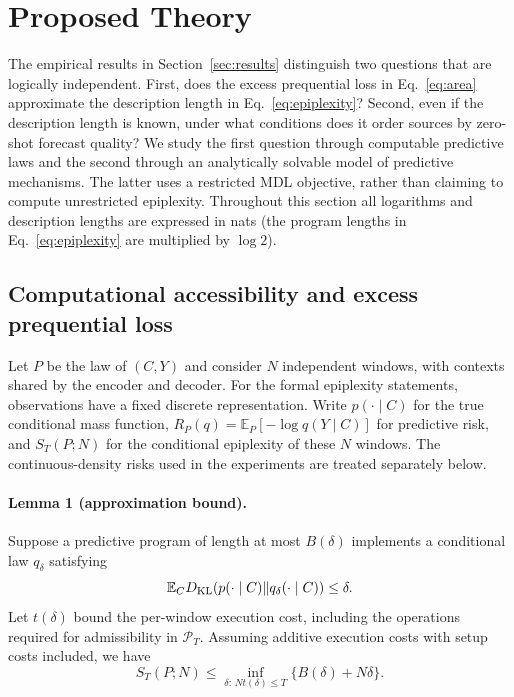 \documentclass[10pt,a4paper]{article}
\theoremstyle{definition}
\begin{document}
\clearpage
\section{Proposed Theory}\label{sec:proposed-theory}

The empirical results in Section~\ref{sec:results} distinguish two
questions that are logically independent. First, does the excess
prequential loss in Eq.~\eqref{eq:area} approximate the description
length in Eq.~\eqref{eq:epiplexity}? Second, even if the description
length is known, under what conditions does it order sources by
zero-shot forecast quality? We study the first question through
computable predictive laws and the second through an analytically
solvable model of predictive mechanisms. The latter uses a restricted
MDL objective, rather than claiming to compute unrestricted epiplexity.
Throughout this section all logarithms and description lengths are
expressed in nats (the program lengths in Eq.~\eqref{eq:epiplexity}
are multiplied by $\log 2$).

\subsection{Computational accessibility and excess prequential loss}
\label{sec:theory-accessibility}

Let $P$ be the law of $(C,Y)$ and consider $N$ independent windows,
with contexts shared by the encoder and decoder. For the formal
epiplexity statements, observations have a fixed discrete
representation. Write $p(\cdot\mid C)$ for the true conditional mass
function, $R_P(q)=\mathbb E_P[-\log q(Y\mid C)]$ for predictive risk,
and $S_T(P;N)$ for the conditional epiplexity of these $N$ windows.
The continuous-density risks used in the experiments are treated
separately below.

\paragraph{Lemma 1 (approximation bound).}
Suppose a predictive program of length at most $B(\delta)$ implements
a conditional law $q_\delta$ satisfying
\[
 \mathbb E_C D_{\rm KL}(p(\cdot\mid C)\Vert q_\delta(\cdot\mid C))
 \leq\delta.
\]
Let $t(\delta)$ bound the per-window execution cost, including the
operations required for admissibility in $\mathcal P_T$.
Assuming additive execution costs with setup costs included, we have
\begin{equation}
 S_T(P;N)\leq
 \inf_{\delta:\,Nt(\delta)\leq T}
 \{B(\delta)+N\delta\}.
 \label{eq:pt-bound}
\end{equation}
\end{document}
